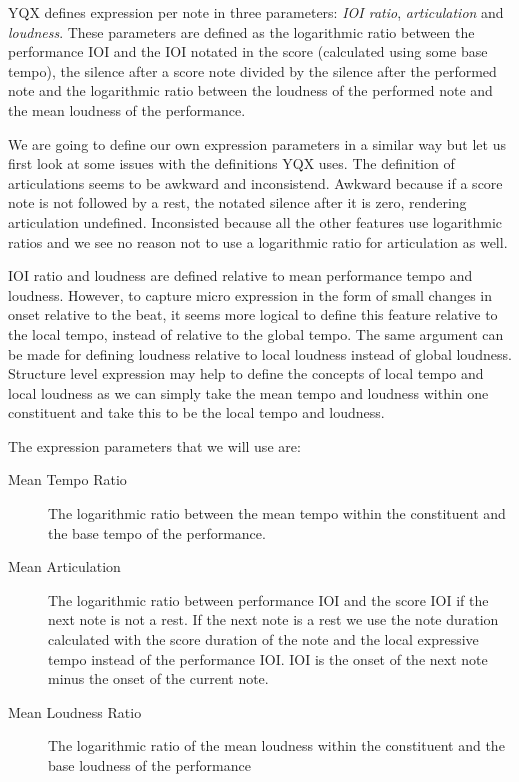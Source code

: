 \documentclass[a4paper,10pt]{article}
\begin{document}
YQX defines expression per note in three parameters: \textit{IOI ratio}, \textit{articulation} and \textit{loudness}. These parameters are defined as the logarithmic ratio between the performance IOI and the IOI notated in the score (calculated using some base tempo), the silence after a score note divided by the silence after the performed note and the logarithmic ratio between the loudness of the performed note and the mean loudness of the performance. 

We are going to define our own expression parameters in a similar way but let us first look at some issues with the definitions YQX uses. The definition of articulations seems to be awkward and inconsistend. Awkward because if a score note is not followed by a rest, the notated silence after it is zero, rendering articulation undefined. Inconsisted because all the other features use logarithmic ratios and we see no reason not to use a logarithmic ratio for articulation as well. 

IOI ratio and loudness are defined relative to mean performance tempo and loudness. However, to capture micro expression in the form of small changes in onset relative to the beat, it seems more logical to define this feature relative to the local tempo, instead of relative to the global tempo. The same argument can be made for defining loudness relative to local loudness instead of global loudness. Structure level expression may help to define the concepts of local tempo and local loudness as we can simply take the mean tempo and loudness within one constituent and take this to be the local tempo and loudness.

The expression parameters that we will use are:
\begin{description}
\item[Mean Tempo Ratio] The logarithmic ratio between the mean tempo within the constituent and the base tempo of the performance.
\item[Mean Articulation] The logarithmic ratio between performance IOI and the score IOI if the next note is not a rest. If the next note is a rest we use the note duration calculated with the score duration of the note and the local expressive tempo instead of the performance IOI. IOI is the onset of the next note minus the onset of the current note.
\item[Mean Loudness Ratio] The logarithmic ratio of the mean loudness within the constituent and the base loudness of the performance
\end{description}
\end{document}

